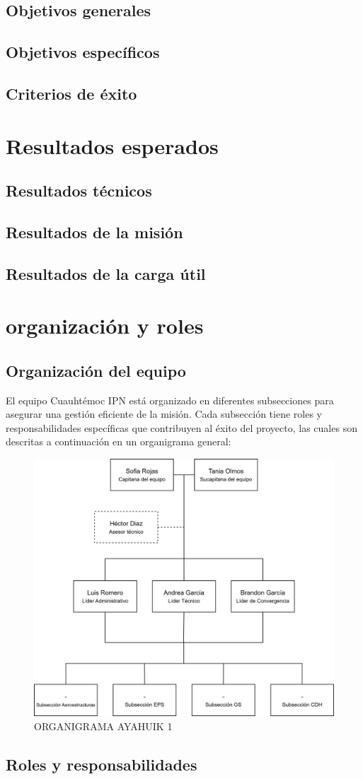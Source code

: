 \documentclass[letterpaper,12pt]{article} %
\begin{document}
    \subsection{Objetivos generales}

    \subsection{Objetivos específicos}
    
    \subsection{Criterios de éxito}

\section{Resultados esperados}

    \subsection{Resultados técnicos}

    \subsection{Resultados de la misión}

    \subsection{Resultados de la carga útil}
\newpage
\section{organización y roles}

    \subsection{Organización del equipo}

    El equipo Cuauhtémoc IPN está organizado en diferentes subsecciones para asegurar una gestión 
    eficiente de la misión. Cada subsección tiene roles y responsabilidades específicas que 
    contribuyen al éxito del proyecto, las cuales son descritas a continuación en un organigrama general:

    \begin{figure}[!h]
      \centerline{\includegraphics[width=.5\textwidth]{ORG-AYA1-GM.png}}
      \caption{ORGANIGRAMA AYAHUIK 1}
      \label{1}
    \end{figure}

    \subsection{Roles y responsabilidades}
\end{document}
